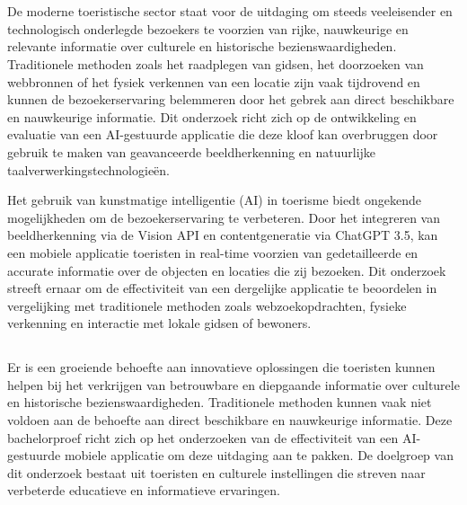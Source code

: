 
\chapter{}%
\label{ch:inleiding}

De moderne toeristische sector staat voor de uitdaging om steeds veeleisender en technologisch onderlegde bezoekers te voorzien van rijke, nauwkeurige en relevante informatie over culturele en historische bezienswaardigheden. Traditionele methoden zoals het raadplegen van gidsen, het doorzoeken van webbronnen of het fysiek verkennen van een locatie zijn vaak tijdrovend en kunnen de bezoekerservaring belemmeren door het gebrek aan direct beschikbare en nauwkeurige informatie. Dit onderzoek richt zich op de ontwikkeling en evaluatie van een AI-gestuurde applicatie die deze kloof kan overbruggen door gebruik te maken van geavanceerde beeldherkenning en natuurlijke taalverwerkingstechnologieën.

Het gebruik van kunstmatige intelligentie (AI) in toerisme biedt ongekende mogelijkheden om de bezoekerservaring te verbeteren. Door het integreren van beeldherkenning via de Vision API en contentgeneratie via ChatGPT 3.5, kan een mobiele applicatie toeristen in real-time voorzien van gedetailleerde en accurate informatie over de objecten en locaties die zij bezoeken. Dit onderzoek streeft ernaar om de effectiviteit van een dergelijke applicatie te beoordelen in vergelijking met traditionele methoden zoals webzoekopdrachten, fysieke verkenning en interactie met lokale gidsen of bewoners.

\section{}%
\label{sec:probleemstelling}

Er is een groeiende behoefte aan innovatieve oplossingen die toeristen kunnen helpen bij het verkrijgen van betrouwbare en diepgaande informatie over culturele en historische bezienswaardigheden. Traditionele methoden kunnen vaak niet voldoen aan de behoefte aan direct beschikbare en nauwkeurige informatie. Deze bachelorproef richt zich op het onderzoeken van de effectiviteit van een AI-gestuurde mobiele applicatie om deze uitdaging aan te pakken. De doelgroep van dit onderzoek bestaat uit toeristen en culturele instellingen die streven naar verbeterde educatieve en informatieve ervaringen.

